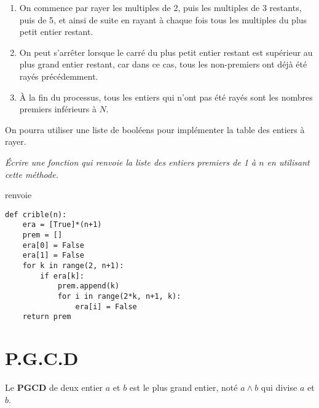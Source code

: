 \begin{enumerate}
    \item On commence par rayer les multiples de 2, puis les multiples de 3 restants, puis de 5,  et ainsi de suite en rayant à chaque fois tous les multiples du plus petit entier restant.
    \item On peut s'arrêter lorsque le carré du plus petit entier restant est supérieur au plus grand entier restant, car dans ce cas, tous les non-premiers ont déjà été rayés précédemment.
    \item À la fin du processus, tous les entiers qui n'ont pas été rayés sont les nombres premiers inférieurs à $N$.
\end{enumerate}
On pourra utiliser une liste de booléens pour implémenter la table des entiers à rayer.
\begin{Exercise}[title = Crible]
\it Écrire une fonction  qui renvoie la liste des entiers premiers de 1 à  $n$ en utilisant cette méthode.

 renvoie \type{[2, 3, 5, 7, 11, 13, 17, 19, 23, 29]}
\end{Exercise}
\begin{Answer}
\begin{lstlisting}
def crible(n):
    era = [True]*(n+1)
    prem = []
    era[0] = False
    era[1] = False
    for k in range(2, n+1):
        if era[k]:
            prem.append(k)
            for i in range(2*k, n+1, k):
                era[i] = False
    return prem
\end{lstlisting}
\newpage
\end{Answer}
\section{P.G.C.D} 
Le {\bf PGCD} de deux entier $a$ et $b$ est le plus grand entier, noté $a\wedge b$ qui divise $a$ et $b$.

